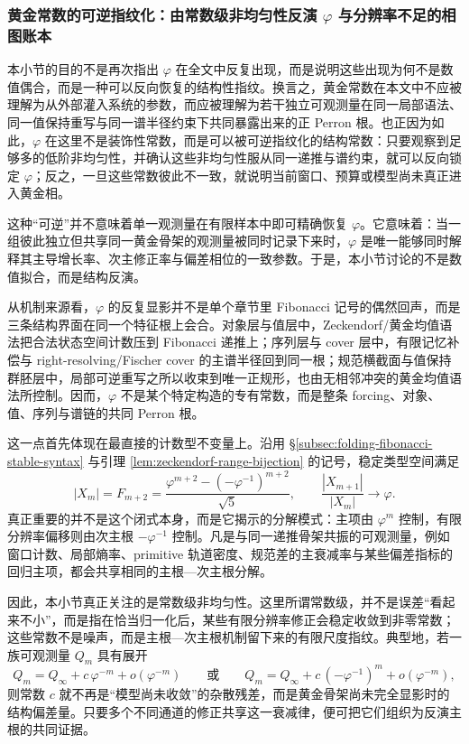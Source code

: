 \subsubsection{黄金常数的可逆指纹化：由常数级非均匀性反演 \texorpdfstring{$\varphi$}{phi} 与分辨率不足的相图账本}\label{subsubsec:discussion-phi-inversion-phase-ledger}
本小节的目的不是再次指出 \(\varphi\) 在全文中反复出现，而是说明这些出现为何不是数值偶合，而是一种可以反向恢复的结构性指纹。换言之，黄金常数在本文中不应被理解为从外部灌入系统的参数，而应被理解为若干独立可观测量在同一局部语法、同一值保持重写与同一谱半径约束下共同暴露出来的正 Perron 根。也正因为如此，\(\varphi\) 在这里不是装饰性常数，而是可以被可逆指纹化的结构常数：只要观察到足够多的低阶非均匀性，并确认这些非均匀性服从同一递推与谱约束，就可以反向锁定 \(\varphi\)；反之，一旦这些常数彼此不一致，就说明当前窗口、预算或模型尚未真正进入黄金相。

这种“可逆”并不意味着单一观测量在有限样本中即可精确恢复 \(\varphi\)。它意味着：当一组彼此独立但共享同一黄金骨架的观测量被同时记录下来时，\(\varphi\) 是唯一能够同时解释其主导增长率、次主修正率与偏差相位的一致参数。于是，本小节讨论的不是数值拟合，而是结构反演。

从机制来源看，\(\varphi\) 的反复显影并不是单个章节里 Fibonacci 记号的偶然回声，而是三条结构界面在同一个特征根上会合。对象层与值层中，Zeckendorf/黄金均值语法把合法状态空间计数压到 Fibonacci 递推上；序列层与 cover 层中，有限记忆补偿与 right-resolving/Fischer cover 的主谱半径回到同一根；规范横截面与值保持群胚层中，局部可逆重写之所以收束到唯一正规形，也由无相邻冲突的黄金均值语法所控制。因而，\(\varphi\) 不是某个特定构造的专有常数，而是整条 forcing、对象、值、序列与谱链的共同 Perron 根。

这一点首先体现在最直接的计数型不变量上。沿用 \S\ref{subsec:folding-fibonacci-stable-syntax} 与引理 \ref{lem:zeckendorf-range-bijection} 的记号，稳定类型空间满足
\[
|X_m|=F_{m+2}
=\frac{\varphi^{m+2}-(-\varphi^{-1})^{m+2}}{\sqrt5},
\qquad
\frac{|X_{m+1}|}{|X_m|}\longrightarrow \varphi.
\]
真正重要的并不是这个闭式本身，而是它揭示的分解模式：主项由 \(\varphi^m\) 控制，有限分辨率偏移则由次主根 \(-\varphi^{-1}\) 控制。凡是与同一递推骨架共振的可观测量，例如窗口计数、局部熵率、primitive 轨道密度、规范差的主衰减率与某些偏差指标的回归主项，都会共享相同的主根—次主根分解。

因此，本小节真正关注的是常数级非均匀性。这里所谓常数级，并不是误差“看起来不小”，而是指在恰当归一化后，某些有限分辨率修正会稳定收敛到非零常数；这些常数不是噪声，而是主根—次主根机制留下来的有限尺度指纹。典型地，若一族可观测量 \(Q_m\) 具有展开
\[
Q_m
=
Q_\infty
+ c\,\varphi^{-m}
+ o(\varphi^{-m})
\qquad\text{或}\qquad
Q_m
=
Q_\infty
+ c\,(-\varphi^{-1})^{m}
+ o(\varphi^{-m}),
\]
则常数 \(c\) 就不再是“模型尚未收敛”的杂散残差，而是黄金骨架尚未完全显影时的结构偏差量。只要多个不同通道的修正共享这一衰减律，便可把它们组织为反演主根的共同证据。

